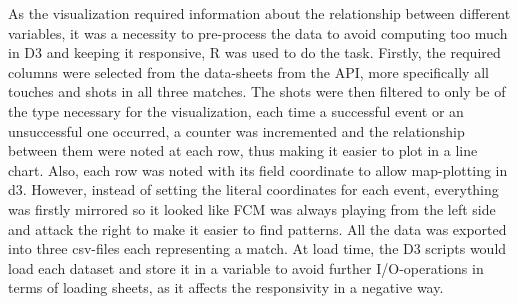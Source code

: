 \documentclass[Report.tex]{subfiles}
\begin{document}
As the visualization required information about the relationship between different variables, it was a necessity to pre-process the data to avoid computing too much in D3 and keeping it responsive, R was used to do the task. Firstly, the required columns were selected from the data-sheets from the API, more specifically all touches and shots in all three matches. The shots were then filtered to only be of the type necessary for the visualization, each time a successful event or an unsuccessful one occurred, a counter was incremented and the relationship between them were noted at each row, thus making it easier to plot in a line chart. Also, each row was noted with its field coordinate to allow map-plotting in d3. However, instead of setting the literal coordinates for each event, everything was firstly mirrored so it looked like FCM was always playing from the left side and attack the right to make it easier to find patterns. All the data was exported into three csv-files each representing a match. At load time, the D3 scripts would load each dataset and store it in a variable to avoid further I/O-operations in terms of loading sheets, as it affects the responsivity in a negative way. 

	
\end{document}
